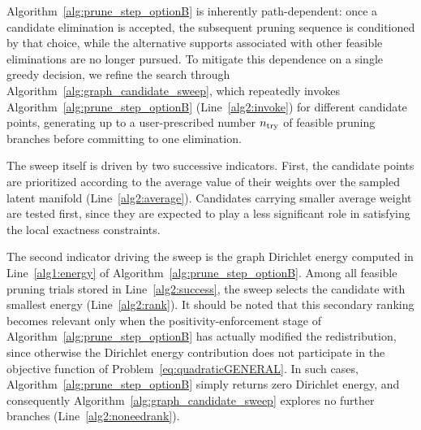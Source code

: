 \documentclass[11pt,a4paper]{article}
\begin{document}
%

Algorithm~\ref{alg:prune_step_optionB}  is inherently
path-dependent: once a candidate elimination is accepted, the subsequent
pruning sequence is conditioned by that choice, while the alternative
supports associated with other feasible eliminations are no longer pursued.
To mitigate this dependence on a single greedy decision, we refine the
search through Algorithm~\ref{alg:graph_candidate_sweep}, which repeatedly
invokes Algorithm~\ref{alg:prune_step_optionB}
(Line~\ref{alg2:invoke}) for different candidate points, generating up to
a user-prescribed number \(n_{\mathrm{try}}\) of feasible pruning branches before
committing to one elimination.



The sweep itself is driven by two successive indicators. First, the
candidate points are prioritized according to the average value of their
weights over the sampled latent manifold (Line~\ref{alg2:average}). Candidates carrying smaller
average weight are tested first,  since they are expected to play a less significant role in
satisfying the local exactness constraints.



The second indicator driving the sweep is the graph Dirichlet energy
computed in Line~\ref{alg1:energy} of
Algorithm~\ref{alg:prune_step_optionB}. Among all feasible pruning trials
stored in Line~\ref{alg2:success}, the sweep selects the candidate with
smallest  energy (Line~\ref{alg2:rank}).  It should be noted that this secondary ranking
becomes relevant only when the positivity-enforcement stage of
Algorithm~\ref{alg:prune_step_optionB} has actually modified the
redistribution, since otherwise the Dirichlet energy contribution does not
participate in the objective function of
Problem~\eqref{eq:quadraticGENERAL}. In such cases,
Algorithm~\ref{alg:prune_step_optionB} simply returns zero Dirichlet
energy, and consequently Algorithm~\ref{alg:graph_candidate_sweep} explores no further
branches (Line~\ref{alg2:noneedrank}).
\end{document}
